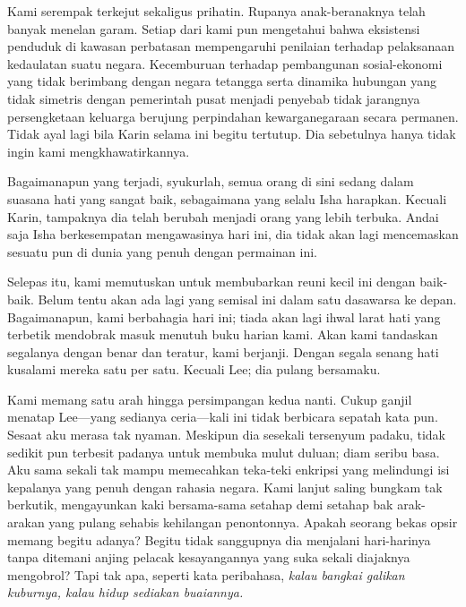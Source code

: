 \documentclass[smalldemyvopaper,11pt,twoside,onecolumn,openright,extrafontsizes]{memoir}
\begin{document}

Kami serempak terkejut sekaligus prihatin. Rupanya anak-beranaknya telah banyak menelan garam. Setiap dari kami pun mengetahui bahwa eksistensi penduduk di kawasan perbatasan mempengaruhi penilaian terhadap pelaksanaan kedaulatan suatu negara. Kecemburuan terhadap pembangunan sosial-ekonomi yang tidak berimbang dengan negara tetangga serta dinamika hubungan yang tidak simetris dengan pemerintah pusat menjadi penyebab tidak jarangnya persengketaan keluarga berujung perpindahan kewarganegaraan secara permanen. Tidak ayal lagi bila Karin selama ini begitu tertutup. Dia sebetulnya hanya tidak ingin kami mengkhawatirkannya.

Bagaimanapun yang terjadi, syukurlah, semua orang di sini sedang dalam suasana hati yang sangat baik, sebagaimana yang selalu Isha harapkan. Kecuali Karin, tampaknya dia telah berubah menjadi orang yang lebih terbuka. Andai saja Isha berkesempatan mengawasinya hari ini, dia tidak akan lagi mencemaskan sesuatu pun di dunia yang penuh dengan permainan ini.


Selepas itu, kami memutuskan untuk membubarkan reuni kecil ini dengan baik-baik. Belum tentu akan ada lagi yang semisal ini dalam satu dasawarsa ke depan. Bagaimanapun, kami berbahagia hari ini; tiada akan lagi ihwal larat hati yang terbetik mendobrak masuk menutuh buku harian kami. Akan kami tandaskan segalanya dengan benar dan teratur, kami berjanji. Dengan segala senang hati kusalami mereka satu per satu. Kecuali Lee; dia pulang bersamaku.


Kami memang satu arah hingga persimpangan kedua nanti. Cukup ganjil menatap Lee---yang sedianya ceria---kali ini tidak berbicara sepatah kata pun. Sesaat aku merasa tak nyaman. Meskipun dia sesekali tersenyum padaku, tidak sedikit pun terbesit padanya untuk membuka mulut duluan; diam seribu basa. Aku sama sekali tak mampu memecahkan teka-teki enkripsi yang melindungi isi kepalanya yang penuh dengan rahasia negara. Kami lanjut saling bungkam tak berkutik, mengayunkan kaki bersama-sama setahap demi setahap bak arak-arakan yang pulang sehabis kehilangan penontonnya. Apakah seorang bekas opsir memang begitu adanya? Begitu tidak sanggupnya dia menjalani hari-harinya tanpa ditemani anjing pelacak kesayangannya yang suka sekali diajaknya mengobrol? Tapi tak apa, seperti kata peribahasa, \textit{kalau bangkai galikan kuburnya, kalau hidup sediakan buaiannya.}
\end{document}
